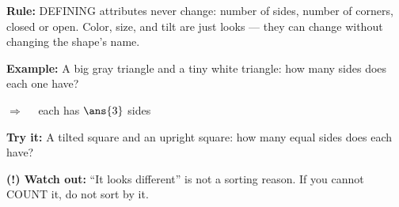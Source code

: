 \documentclass[12pt]{article}
\begin{document}

\begin{formulabox}
\textbf{Rule:} DEFINING attributes never change: number of sides, number of
corners, closed or open. Color, size, and tilt are just looks --- they can
change without changing the shape's name.
\end{formulabox}

\begin{examplebox}
\textbf{Example:} \quad A big gray triangle and a tiny white triangle: how
many sides does each one have?

$\Rightarrow\quad$ each has $\ans{3}$ sides
\end{examplebox}

\begin{tryitbox}
\textbf{Try it:} \quad A tilted square and an upright square: how many equal
sides does each have?\\[2pt]
\end{tryitbox}

\begin{watchoutbox}
\textbf{(!) Watch out:} ``It looks different'' is not a sorting reason. If
you cannot COUNT it, do not sort by it.
\end{watchoutbox}
\end{document}
